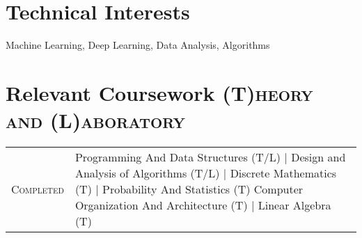 \documentclass[a4paper,10pt]{extarticle} %
\begin{document}
\vspace{-0.4cm}
\section{\textcolor{primary}{Technical Interests}}
\noindent Machine Learning, Deep Learning, Data Analysis,  Algorithms \\





\vspace{-0.2cm}
\section{\textcolor{primary}{Relevant Coursework}
\hfill\small\textsc{(T)heory and (L)aboratory}}

\begin{tabular}{r|p{15cm}}
\textsc{Completed} & Programming And Data Structures (T/L) | Design and Analysis of Algorithms (T/L) | Discrete Mathematics (T) | Probability And Statistics (T) Computer Organization And Architecture (T) | Linear Algebra (T)
\end{tabular}

\end{document}
